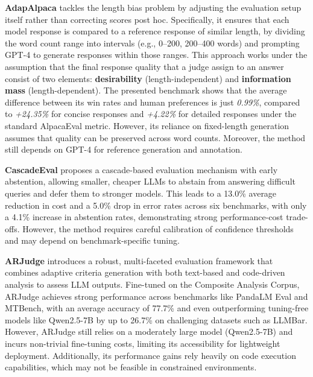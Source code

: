 \documentclass[sigconf, authoryear]{acmart}
\begin{document}
\textbf{AdapAlpaca} tackles the length bias problem by adjusting the evaluation setup itself rather than correcting scores post hoc.
Specifically, it ensures that each model response is compared to a reference response of similar length, by dividing the word count range into intervals (e.g., 0–200, 200–400 words) and prompting GPT-4 to generate responses within those ranges.
This approach works under the assumption that the final response quality that a judge assign to an answer consist of two elements: \textbf{desirability} (length-independent) and \textbf{information mass} (length-dependent).
The presented benchmark shows that the average difference between its win rates and human preferences is just \textit{0.99\%}, compared to \textit{+24.35\%} for concise responses and \textit{+4.22\%} for detailed responses under the standard AlpacaEval metric.
However, its reliance on fixed-length generation assumes that quality can be preserved across word counts.
Moreover, the method still depends on GPT-4 for reference generation and annotation\cite{hu2024explaininglengthbiasllmbased}.


\textbf{CascadeEval} proposes a cascade-based evaluation mechanism with early abstention, allowing smaller, cheaper LLMs to abstain from answering difficult queries and defer them to stronger models.
This leads to a 13.0\% average reduction in cost and a 5.0\% drop in error rates across six benchmarks, with only a 4.1\% increase in abstention rates, demonstrating strong performance-cost trade-offs.
However, the method requires careful calibration of confidence thresholds and may depend on benchmark-specific tuning\cite{cascade_eval}.

\textbf{ARJudge} introduces a robust, multi-faceted evaluation framework that combines adaptive criteria generation with both text-based and code-driven analysis to assess LLM outputs.
Fine-tuned on the Composite Analysis Corpus, ARJudge achieves strong performance across benchmarks like PandaLM Eval and MTBench, with an average accuracy of 77.7\% and even outperforming tuning-free models like Qwen2.5-7B by up to 26.7\% on challenging datasets such as LLMBar.
However, ARJudge still relies on a moderately large model (Qwen2.5-7B) and incurs non-trivial fine-tuning costs, limiting its accessibility for lightweight deployment.
Additionally, its performance gains rely heavily on code execution capabilities, which may not be feasible in constrained environments\cite{ar_judge}.
\end{document}
